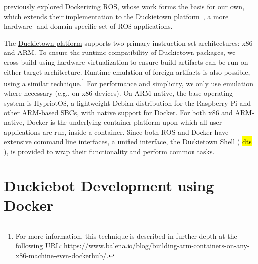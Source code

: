\documentclass[12pt,initial,twoside,maitrise]{dms}
\newcommand{\inline}[1]{%
    \begingroup%
    \sethlcolor{slightgray}%
    \hl{\ttfamily\small #1}%
    \endgroup
}
\numberwithin{equation}{section}
\numberwithin{table}{chapter}
\numberwithin{figure}{chapter}
\begin{document}
\citet{white2017ros-docker} previously explored Dockerizing ROS, whose work forms the basis for our own, which extends their implementation to the Duckietown platform~\citep{paull2017duckietown}, a more hardware- and domain-specific set of ROS applications.

The \href{https://www.duckietown.org}{Duckietown platform} supports two primary instruction set architectures: x86 and ARM. To ensure the runtime compatibility of Duckietown packages, we cross-build using hardware virtualization to ensure build artifacts can be run on either target architecture. Runtime emulation of foreign artifacts is also possible, using a similar technique.\footnote{For more information, this technique is described in further depth at the following URL: \url{https://www.balena.io/blog/building-arm-containers-on-any-x86-machine-even-dockerhub/}.} For performance and simplicity, we only use emulation where necessary (e.g., on x86 devices). On ARM-native, the base operating system is \hyperref[subsec:hypriot]{HypriotOS}, a lightweight Debian distribution for the Raspberry Pi and other ARM-based SBCs, with native support for Docker. For both x86 and ARM-native, Docker is the underlying container platform upon which all user applications are run, inside a container. Since both ROS and Docker have extensive command line interfaces, a unified interface, the \href{https://github.com/duckietown/duckietown-shell}{Duckietown Shell} (\inline{dts}), is provided to wrap their functionality and perform common tasks.

\section{Duckiebot Development using Docker}
\end{document}
